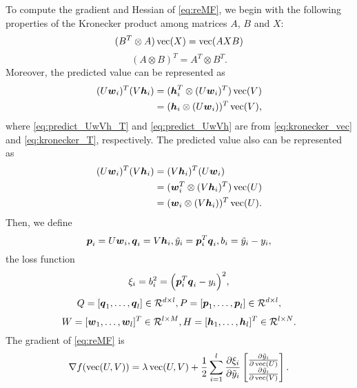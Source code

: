 \label{sec:NewtonFM}
To compute the gradient and Hessian of \eqref{eq:reMF}, we begin with the following properties of  the Kronecker product among matrices $A$, $B$ and $X$:
\begin{equation}
(B^T \otimes A)\operatorname*{vec}(X) = \operatorname*{vec}(AXB)
\label{eq:kronecker_vec}
\end{equation}
\begin{equation}
(A \otimes B)^T = A^T \otimes B^T
\label{eq:kronecker_T}.
\end{equation}
Moreover, the predicted value can be represented as
\begin{align}
(U \boldsymbol{w}_i)^T (V \boldsymbol{h}_i) &= (\boldsymbol{h}_i^T \otimes (U \boldsymbol{w}_i)^T)\operatorname*{vec}(V)\label{eq:predict_UwVh_T} \\
&= (\boldsymbol{h}_i \otimes (U \boldsymbol{w}_i))^T\operatorname*{vec}(V)
\label{eq:predict_UwVh},
\end{align}
where \eqref{eq:predict_UwVh_T} and \eqref{eq:predict_UwVh} are from \eqref{eq:kronecker_vec} and \eqref{eq:kronecker_T}, respectively.
The predicted value also can be represented as
\begin{align}
(U \boldsymbol{w}_i)^T (V \boldsymbol{h}_i) &= (V \boldsymbol{h}_i)^T (U \boldsymbol{w}_i) \nonumber \\
&= (\boldsymbol{w}_i^T \otimes (V \boldsymbol{h}_i)^T)\operatorname*{vec}(U)\nonumber \\
&= (\boldsymbol{w}_i \otimes (V \boldsymbol{h}_i))^T \operatorname*{vec}(U)
\label{eq:predict_VhUw}.
\end{align}
Then, we define 
\begin{equation}
\boldsymbol{p}_i = U\boldsymbol{w}_i ,
\boldsymbol{q}_i = V\boldsymbol{h}_i ,
\tilde{y}_i = \boldsymbol{p}_i^T\boldsymbol{q}_i,
b_i = \tilde{y}_i-y_i,
\label{eq:pqyb}
\end{equation}
the loss function 
\begin{equation*}
\xi_i = b_i^2 = \Bigl(\boldsymbol{p}_i^T\boldsymbol{q}_i-y_i\Bigr)^2, 
\end{equation*}
\begin{align*}
Q=[\boldsymbol{q}_1,\dots,\boldsymbol{q}_l] \in \mathcal R^{d\times l},
P=[\boldsymbol{p}_1,\dots,\boldsymbol{p}_l] \in \mathcal R^{d\times l},
\end{align*}
\begin{equation}
W=[\boldsymbol{w}_1,\dots,\boldsymbol{w}_l]^T \in \mathcal R^{l\times M},
H=[\boldsymbol{h}_1,\dots,\boldsymbol{h}_l]^T \in \mathcal R^{l\times N}.
\label{eq:WandH}
\end{equation}
The gradient of \eqref{eq:reMF} is
\begin{align}
\nabla {f}(\operatorname*{vec}(U, V)) = \lambda \operatorname*{vec}(U,V) + \frac{1}{2}\sum_{i=1}^{l}\frac{\partial \xi_i}{\partial \tilde{y}_i}\begin{bmatrix} \frac{\partial \tilde{y}_i}{\partial \operatorname*{vec}(U)} \\ \frac{\partial \tilde{y}_i}{\partial \operatorname*{vec}(V)} \end{bmatrix}
\label{eq:gradUV}.
\end{align}
